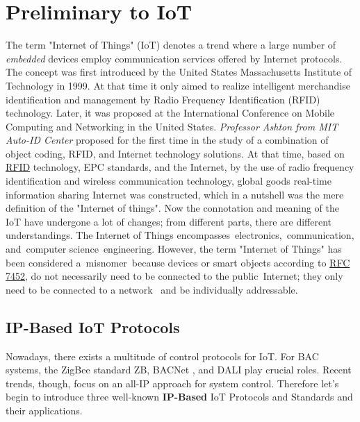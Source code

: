 \documentclass[10pt,journal,compsoc]{IEEEtran}
\begin{document}
	\section{Preliminary to IoT}
	The term  "Internet of Things" (IoT) denotes a trend where a large
	number of \emph{embedded} devices employ communication services offered by Internet protocols\cite{rfc7452}.
	The concept was first introduced by the United States Massachusetts Institute
	of Technology in 1999\cite{yu2017research}. At that time it only aimed to realize
	intelligent merchandise identification and management by
	Radio Frequency Identification (RFID) technology\cite{yu2017research}. Later, it was proposed at the International Conference on Mobile Computing and Networking in the United States. \emph{Professor Ashton from MIT Auto-ID Center} proposed for the first time in the study of a combination of object coding, RFID, and Internet technology solutions\cite{guo2017research}.\vspace{1cm}
	\cite{guo2017research}At that time, based on \href{https://en.wikipedia.org/wiki/Radio-frequency_identification}{RFID} technology, EPC standards, and the Internet, by the use of
	radio frequency identification and wireless communication
	technology, global goods real-time information sharing
	Internet was constructed\cite{guo2017research}, which in a nutshell was the mere definition of the "Internet of things".\newline
	Now the connotation and meaning of the IoT have undergone a lot of changes;
	from different parts, there are different understandings.
	The Internet of Things encompasses electronics, communication, and computer science engineering. However, the term "Internet of Things" has been considered a misnomer because devices or smart objects according to \href{https://www.rfc-editor.org/info/rfc7452}{RFC 7452}, do not necessarily need to be connected to the public Internet; they only need to be connected to a network \cite{whatisnetwork} and be individually addressable.

	\subsection{IP-Based IoT Protocols}
	Nowadays, there exists a multitude of control protocols for IoT. For
	BAC systems, the ZigBee standard ZB, BACNet , and
DALI play crucial roles. Recent trends, though, focus on an all-IP
	approach for system control\cite{rfc8576}. Therefore let's begin to introduce three well-known \textbf{IP-Based} IoT Protocols and Standards and their applications.
\end{document}
